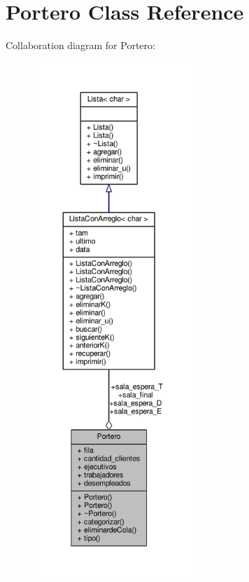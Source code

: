 \hypertarget{class_portero}{\section{Portero Class Reference}
\label{class_portero}
}


Collaboration diagram for Portero\+:
\nopagebreak
\begin{figure}[H]
\begin{center}
\leavevmode
\includegraphics[height=550pt]{class_portero__coll__graph}
\end{center}
\end{figure}
